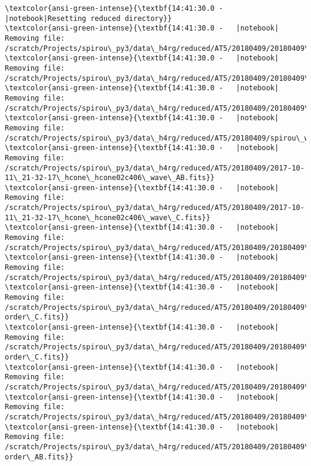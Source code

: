 \documentclass[11pt]{article}
\begin{document}
    \begin{Verbatim}[commandchars=\\\{\}]
\textcolor{ansi-green-intense}{\textbf{14:41:30.0 -   |notebook|Resetting reduced directory}}
\textcolor{ansi-green-intense}{\textbf{14:41:30.0 -   |notebook|    Removing file: /scratch/Projects/spirou\_py3/data\_h4rg/reduced/AT5/20180409/20180409\_dark\_dark\_001\_pp.fits}}
\textcolor{ansi-green-intense}{\textbf{14:41:30.0 -   |notebook|    Removing file: /scratch/Projects/spirou\_py3/data\_h4rg/reduced/AT5/20180409/20180409\_dark\_dark\_001\_pp\_badpixel.fits}}
\textcolor{ansi-green-intense}{\textbf{14:41:30.0 -   |notebook|    Removing file: /scratch/Projects/spirou\_py3/data\_h4rg/reduced/AT5/20180409/20180409\_flat\_flat\_001\_pp\_badpixel.fits}}
\textcolor{ansi-green-intense}{\textbf{14:41:30.0 -   |notebook|    Removing file: /scratch/Projects/spirou\_py3/data\_h4rg/reduced/AT5/20180409/spirou\_wave\_ini3.fits}}
\textcolor{ansi-green-intense}{\textbf{14:41:30.0 -   |notebook|    Removing file: /scratch/Projects/spirou\_py3/data\_h4rg/reduced/AT5/20180409/2017-10-11\_21-32-17\_hcone\_hcone02c406\_wave\_AB.fits}}
\textcolor{ansi-green-intense}{\textbf{14:41:30.0 -   |notebook|    Removing file: /scratch/Projects/spirou\_py3/data\_h4rg/reduced/AT5/20180409/2017-10-11\_21-32-17\_hcone\_hcone02c406\_wave\_C.fits}}
\textcolor{ansi-green-intense}{\textbf{14:41:30.0 -   |notebook|    Removing file: /scratch/Projects/spirou\_py3/data\_h4rg/reduced/AT5/20180409/20180409\_dark\_flat\_001\_pp\_order\_profile\_C.fits}}
\textcolor{ansi-green-intense}{\textbf{14:41:30.0 -   |notebook|    Removing file: /scratch/Projects/spirou\_py3/data\_h4rg/reduced/AT5/20180409/20180409\_dark\_flat\_001\_pp\_loco\_C.fits}}
\textcolor{ansi-green-intense}{\textbf{14:41:30.0 -   |notebook|    Removing file: /scratch/Projects/spirou\_py3/data\_h4rg/reduced/AT5/20180409/20180409\_dark\_flat\_001\_pp\_fwhm-order\_C.fits}}
\textcolor{ansi-green-intense}{\textbf{14:41:30.0 -   |notebook|    Removing file: /scratch/Projects/spirou\_py3/data\_h4rg/reduced/AT5/20180409/20180409\_dark\_flat\_001\_pp\_with-order\_C.fits}}
\textcolor{ansi-green-intense}{\textbf{14:41:30.0 -   |notebook|    Removing file: /scratch/Projects/spirou\_py3/data\_h4rg/reduced/AT5/20180409/20180409\_flat\_dark\_001\_pp\_order\_profile\_AB.fits}}
\textcolor{ansi-green-intense}{\textbf{14:41:30.0 -   |notebook|    Removing file: /scratch/Projects/spirou\_py3/data\_h4rg/reduced/AT5/20180409/20180409\_flat\_dark\_001\_pp\_loco\_AB.fits}}
\textcolor{ansi-green-intense}{\textbf{14:41:30.0 -   |notebook|    Removing file: /scratch/Projects/spirou\_py3/data\_h4rg/reduced/AT5/20180409/20180409\_flat\_dark\_001\_pp\_fwhm-order\_AB.fits}}

\end{Verbatim}
\end{document}
